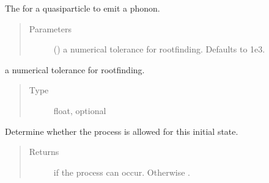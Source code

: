 \documentclass[letterpaper,10pt,english]{sphinxmanual}
\begin{document}
\begin{fulllineitems}
\label{\detokenize{code_structure:scdc.interaction.QuasiparticlePhononEmission}}
The  for a quasiparticle to emit a phonon.
\begin{quote}\begin{description}
\item[{Parameters}] \leavevmode
{} (\sphinxstyleliteralemphasis{\sphinxupquote{, }}) \textendash{} a numerical tolerance for root\sphinxhyphen{}finding.
Defaults to 1e\sphinxhyphen{}3.

\end{description}\end{quote}

\begin{fulllineitems}
\label{\detokenize{code_structure:scdc.interaction.QuasiparticlePhononEmission.tolerance}}
a numerical tolerance for root\sphinxhyphen{}finding.
\begin{quote}\begin{description}
\item[{Type}] \leavevmode
float, optional

\end{description}\end{quote}

\end{fulllineitems}


\begin{fulllineitems}
\label{\detokenize{code_structure:scdc.interaction.QuasiparticlePhononEmission.allowed}}
Determine whether the process is allowed for this initial state.
\begin{quote}\begin{description}
\item[{Returns}] \leavevmode
{} if the process can occur. Otherwise .


\end{description}
\end{quote}
\end{fulllineitems}
\end{fulllineitems}
\end{document}

